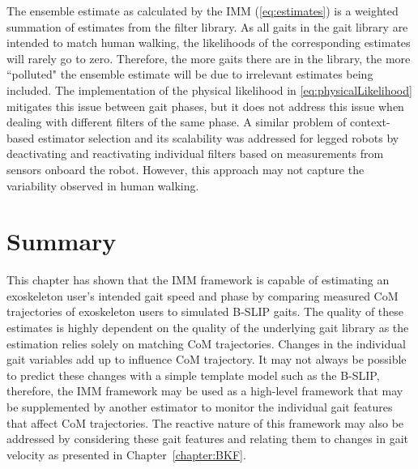The ensemble estimate as calculated by the IMM (\ref{eq:estimates}) is a weighted summation of estimates from the filter library. As all gaits in the gait library are intended to match human walking, the likelihoods of the corresponding estimates will rarely go to zero. Therefore, the more gaits there are in the library, the more ``polluted" the ensemble estimate will be due to irrelevant estimates being included. The implementation of the physical likelihood in \eqref{eq:physicalLikelihood} mitigates this issue between gait phases, but it does not address this issue when dealing with different filters of the same phase. A similar problem of context-based estimator selection and its scalability was addressed for legged robots by deactivating and reactivating individual filters \cite{skaff2010context} based on measurements from sensors onboard the robot. However, this approach may not capture the variability observed in human walking.

\section{Summary}
This chapter has shown that the IMM framework is capable of estimating an exoskeleton user's intended gait speed and phase by comparing measured CoM trajectories of exoskeleton users to simulated B-SLIP gaits. The  quality of these estimates is highly dependent on the quality of the underlying gait library as the estimation relies solely on matching CoM trajectories. Changes in the individual gait variables add up to influence CoM trajectory. It may not always be possible to predict these changes with a simple template model such as the B-SLIP, therefore, the IMM framework may be used as a high-level framework that may be supplemented by another estimator to monitor the individual gait features that affect CoM trajectories. The reactive nature of this framework may also be addressed by considering these gait features and relating them to changes in gait velocity as presented in Chapter~\ref{chapter:BKF}.